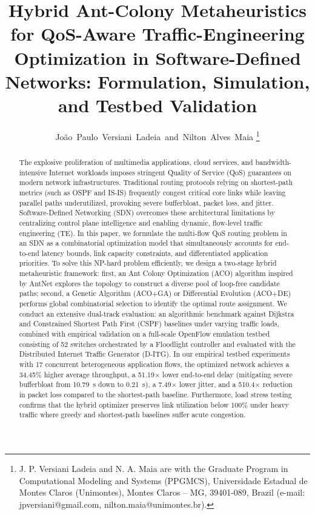\documentclass[journal]{IEEEtran}
\begin{document}
\title{Hybrid Ant-Colony Metaheuristics for QoS-Aware Traffic-Engineering Optimization in Software-Defined Networks: Formulation, Simulation, and Testbed Validation}

\author{Jo\~{a}o~Paulo~Versiani~Ladeia~and~Nilton~Alves~Maia%
\thanks{J. P. Versiani Ladeia and N. A. Maia are with the Graduate Program in Computational Modeling and Systems (PPGMCS), Universidade Estadual de Montes Claros (Unimontes), Montes Claros -- MG, 39401-089, Brazil (e-mail: jpversiani@gmail.com, nilton.maia@unimontes.br).}}


\maketitle

\begin{abstract}
The explosive proliferation of multimedia applications, cloud services, and bandwidth-intensive Internet workloads imposes stringent Quality of Service (QoS) guarantees on modern network infrastructures. Traditional routing protocols relying on shortest-path metrics (such as OSPF and IS-IS) frequently congest critical core links while leaving parallel paths underutilized, provoking severe bufferbloat, packet loss, and jitter. Software-Defined Networking (SDN) overcomes these architectural limitations by centralizing control plane intelligence and enabling dynamic, flow-level traffic engineering (TE). In this paper, we formulate the multi-flow QoS routing problem in an SDN as a combinatorial optimization model that simultaneously accounts for end-to-end latency bounds, link capacity constraints, and differentiated application priorities. To solve this NP-hard problem efficiently, we design a two-stage hybrid metaheuristic framework: first, an Ant Colony Optimization (ACO) algorithm inspired by AntNet explores the topology to construct a diverse pool of loop-free candidate paths; second, a Genetic Algorithm (ACO$+$GA) or Differential Evolution (ACO$+$DE) performs global combinatorial selection to identify the optimal route assignment. We conduct an extensive dual-track evaluation: an algorithmic benchmark against Dijkstra and Constrained Shortest Path First (CSPF) baselines under varying traffic loads, combined with empirical validation on a full-scale OpenFlow emulation testbed consisting of 52 switches orchestrated by a Floodlight controller and evaluated with the Distributed Internet Traffic Generator (D-ITG). In our empirical testbed experiments with 17 concurrent heterogeneous application flows, the optimized network achieves a 34.45\% higher average throughput, a 51.19$\times$ lower end-to-end delay (mitigating severe bufferbloat from 10.79~s down to 0.21~s), a 7.49$\times$ lower jitter, and a 510.4$\times$ reduction in packet loss compared to the shortest-path baseline. Furthermore, load stress testing confirms that the hybrid optimizer preserves link utilization below 100\% under heavy traffic where greedy and shortest-path baselines suffer acute congestion.
\end{abstract}
\end{document}

